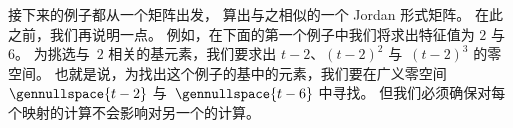 
接下来的例子都从一个矩阵出发，
算出与之相似的一个 Jordan 形式矩阵。
在此之前，我们再说明一点。
例如，在下面的第一个例子中我们将求出特征值为 $2$
与~$6$。
为挑选与~\( 2\) 相关的基元素，我们要求出
$t-2$、\( (t-2)^2 \) 与~\( (t-2)^3\) 的零空间。
也就是说，为找出这个例子的基中的元素，我们要在广义零空间
$\gennullspace{t-2}$ 与~$\gennullspace{t-6}$ 中寻找。
但我们必须确保对每个映射的计算不会影响对另一个的计算。



